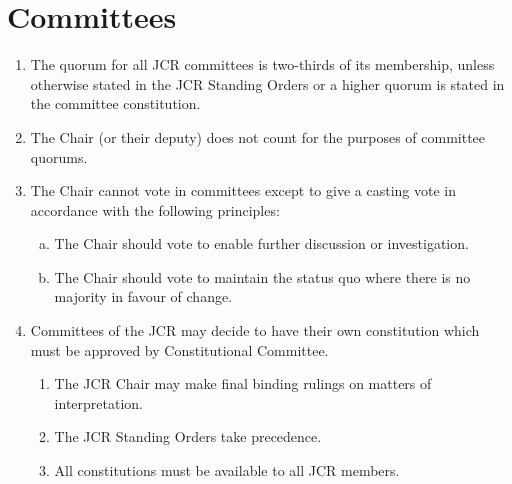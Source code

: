\documentclass[12pt]{article}
\begin{document}
\section{Committees}
\begin{enumerate}
    \item The quorum for all JCR committees is two-thirds of its membership, unless otherwise stated in the JCR Standing Orders or a higher quorum is stated in the committee constitution.
    \item The Chair (or their deputy) does not count for the purposes of committee quorums.
    \item \label{Chair Vote} The Chair cannot vote in committees except to give a casting vote in accordance with the following principles:
    \begin{enumerate}[(a)]
        \item The Chair should vote to enable further discussion or investigation.
        \item The Chair should vote to maintain the status quo where there is no majority in favour of change.
    \end{enumerate}
    \item Committees of the JCR may decide to have their own constitution which must be approved by Constitutional Committee.
    \begin{enumerate}
        \item The JCR Chair may make final binding rulings on matters of interpretation.
        \item The JCR Standing Orders take precedence.
        \item All constitutions must be available to all JCR members.
    \end{enumerate}

\end{enumerate}
\end{document}
